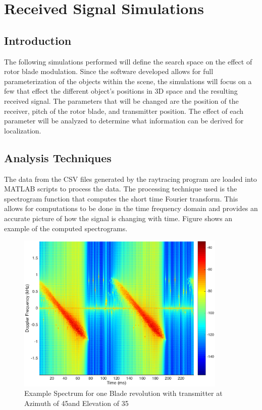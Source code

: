 \chapter{Received Signal Simulations} \label{ch:simulations}

\section{Introduction}
The following simulations performed will define the search space on the effect of rotor blade modulation. Since the software developed allows for full parameterization of the objects within the scene, the simulations will focus on a few that effect the different object's positions in 3D space and the resulting received signal. The parameters that will be changed are the position of the receiver, pitch of the rotor blade, and transmitter position. The effect of each parameter will be analyzed to determine what information can be derived for localization.


\section{Analysis Techniques}
The data from the CSV files generated by the raytracing program are loaded into MATLAB scripts to process the data. The processing technique used is the spectrogram function that computes the short time Fourier transform. This allows for computations to be done in the time frequency domain and provides an accurate picture of how the signal is changing with time. Figure \label{fig:test_spec} shows an example of the computed spectrograms.


\begin{figure}
	\begin{center}
		\includegraphics[width=10cm]{images/simulation/test_analysis_spectrogram.eps}
		\caption{Example Spectrum for one Blade revolution with transmitter at Azimuth of 45\textdegree \space and Elevation of 35\textdegree}
		\label{fig:test_spec}
	\end{center}
\end{figure}

